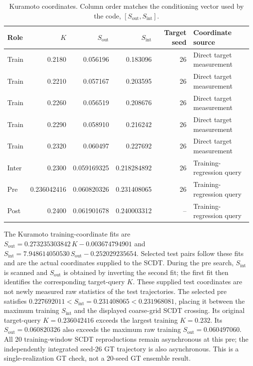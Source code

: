\documentclass[10pt,a4paper]{article}
\begin{document}
\begin{table}[H]
\centering
\caption{Kuramoto coordinates. Column order matches the conditioning vector
used by the code, $[S_{\mathrm{out}},S_{\mathrm{int}}]$.}
\label{tab:kura-coordinates}
\small
\begin{tabularx}{\textwidth}{@{}lrrrrY@{}}
\toprule
Role & $K$ & $S_{\mathrm{out}}$ & $S_{\mathrm{int}}$ & Target seed & Coordinate source \\
\midrule
Train & 0.2180 & 0.056196 & 0.183096 & 26 & Direct target measurement \\
Train & 0.2210 & 0.057167 & 0.203595 & 26 & Direct target measurement \\
Train & 0.2260 & 0.056519 & 0.208676 & 26 & Direct target measurement \\
Train & 0.2290 & 0.058910 & 0.216242 & 26 & Direct target measurement \\
Train & 0.2320 & 0.060497 & 0.227692 & 26 & Direct target measurement \\
 Inter & 0.2300 & 0.059169325 & 0.218284892 & 26 & Training-regression query \\
 Pre & 0.236042416 & 0.060820326 & 0.231408065 & 26 & Training-regression query \\
 Post & 0.2400 & 0.061901678 & 0.240003312 & -- & Training-regression query \\
\bottomrule
\end{tabularx}
\end{table}

The Kuramoto training-coordinate fits are
$S_{\mathrm{out}}=0.273235303842\,K-0.003674794901$ and
$S_{\mathrm{int}}=7.948614050530\,S_{\mathrm{out}}-0.252029235654$.
Selected test pairs follow these fits and are the actual coordinates supplied
to the SCDT. During the pre search, $S_{\mathrm{int}}$ is scanned and
$S_{\mathrm{out}}$ is obtained by inverting the second fit; the first fit
then identifies the corresponding target-query $K$. These supplied test
coordinates are not newly measured raw statistics of the test trajectories.
The selected pre satisfies
$0.227692011<S_{\mathrm{int}}=0.231408065<0.231968081$, placing it
between the maximum training $S_{\mathrm{int}}$ and the displayed coarse-grid
SCDT crossing. Its original target-query $K=0.236042416$ exceeds the largest
training $K=0.232$. Its $S_{\mathrm{out}}=0.060820326$ also exceeds the
maximum raw training $S_{\mathrm{out}}=0.060497060$.
All 20 training-window SCDT reproductions remain asynchronous at this pre;
the independently integrated seed-26 GT trajectory is also asynchronous.
This is a single-realization GT check, not a 20-seed GT ensemble result.
\end{document}
